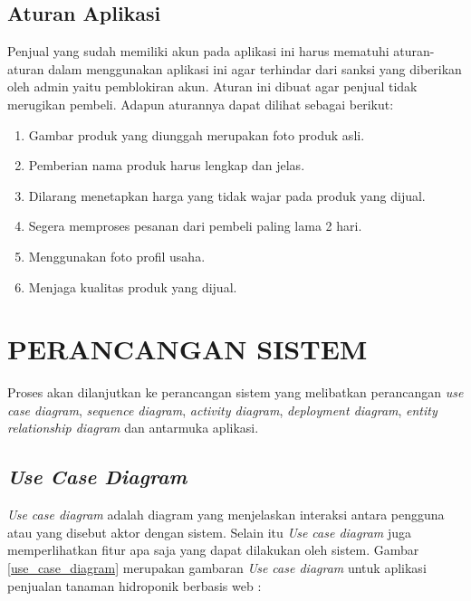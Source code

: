 \subsection{Aturan Aplikasi}

Penjual yang sudah memiliki akun pada aplikasi ini harus mematuhi aturan-aturan dalam menggunakan aplikasi ini agar terhindar dari sanksi yang diberikan oleh admin yaitu pemblokiran akun. Aturan ini dibuat agar penjual tidak merugikan pembeli. Adapun aturannya dapat dilihat sebagai berikut:

\begin{enumerate}
	\item Gambar produk yang diunggah merupakan foto produk asli.
	\item Pemberian nama produk harus lengkap dan jelas.
	\item Dilarang menetapkan harga yang tidak wajar pada produk yang dijual.
	\item Segera memproses pesanan dari pembeli paling lama 2 hari.
	\item Menggunakan foto profil usaha.
	\item Menjaga kualitas produk yang dijual.
\end{enumerate}

\section{\uppercase{Perancangan Sistem}}
Proses akan dilanjutkan ke perancangan sistem yang melibatkan perancangan \textit{use case diagram}, \textit{sequence diagram}, \textit{activity diagram}, \textit{deployment diagram}, \textit{entity relationship diagram} dan antarmuka aplikasi. 

\subsection{\textit{Use Case Diagram}}
\textit{Use case diagram} adalah diagram yang menjelaskan interaksi antara pengguna atau yang disebut aktor dengan sistem. Selain itu \textit{Use case diagram} juga memperlihatkan fitur apa saja yang dapat dilakukan oleh sistem. Gambar \ref*{use_case_diagram} merupakan gambaran \textit{Use case diagram} untuk aplikasi penjualan tanaman hidroponik berbasis web :

